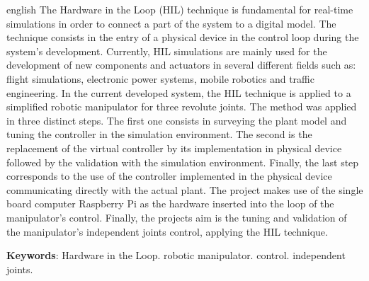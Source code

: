 \begin{resumo}[Abstract]
 \begin{otherlanguage*}{english}
  The Hardware in the Loop (HIL) technique is fundamental for real-time simulations in order to connect
  a part of the system to a digital model. The technique consists in the entry of a physical device in
  the control loop during the system's development. Currently, HIL simulations are mainly used for the 
  development of new components and actuators in several different fields such as: flight simulations, 
  electronic power systems, mobile robotics and traffic engineering. In the current developed system, the HIL
  technique is applied to a simplified robotic manipulator for three revolute joints. The method was
  applied in three distinct steps. The first one consists in surveying the plant model and tuning the
  controller in the simulation environment. The second is the replacement of the virtual controller by
  its implementation in physical device followed by the validation with the simulation environment.
  Finally, the last step corresponds to the use of the controller implemented in the physical device
  communicating directly with the actual plant. The project makes use of the single board computer 
  Raspberry Pi as the hardware inserted into the loop of the manipulator's control. Finally, the 
  projects aim is the tuning and validation of the manipulator's independent joints control, 
  applying the HIL technique.

  \vspace{\onelineskip}
 
   \noindent 
   \textbf{Keywords}: Hardware in the Loop. robotic manipulator. control. independent joints.
 \end{otherlanguage*}
\end{resumo}